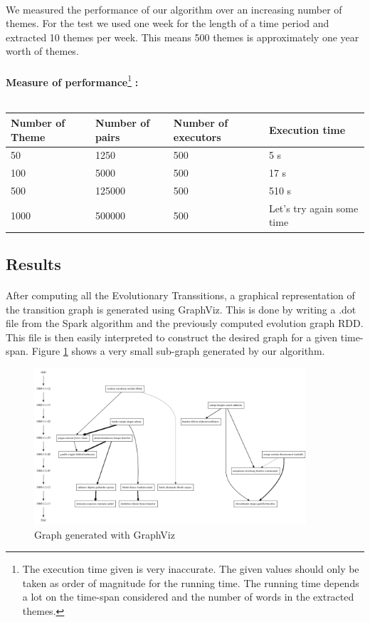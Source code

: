 \paragraph{}
We measured the performance of our algorithm over an increasing number of themes. For the test we used one week for the length of a time period and extracted 10 themes per week. This means 500 themes is approximately one year worth of themes.

\paragraph{}
\textbf{Measure of performance}\footnote{The execution time given is very inaccurate. The given values should only be taken as order of magnitude for the running time. The running time depends a lot on the time-span considered and the number of words in the extracted themes.}\textbf{ :}~\\
~\newline
\begin{tabular}{l|l|l|l}
\label{tab:quadratic}
Number of Theme & Number of pairs & Number of executors & Execution time \\ \hline
50 & 1250 & 500 & 5 s \\
100 & 5000 & 500 & 17 s \\
500 & 125000 & 500 & 510 s \\
1000 & 500000 & 500 & Let's try again some time \\
\end{tabular}

\subsection{Results}
\label{sec:EvoGraphResults}

\paragraph{}
After computing all the Evolutionary Transsitions, a graphical representation of the transition graph is generated using GraphViz. This is done by writing a .dot file from the Spark algorithm and the previously computed evolution graph RDD. This file is then easily interpreted to construct the desired graph for a given time-span. Figure \ref{fig:graph} shows a very small sub-graph generated by our algorithm. 

\begin{figure}[H]
\begin{center}
\includegraphics[width=0.9\textwidth]{images/graph.png}
\caption{Graph generated with GraphViz}
\label{fig:graph}
\end{center}
\end{figure}
